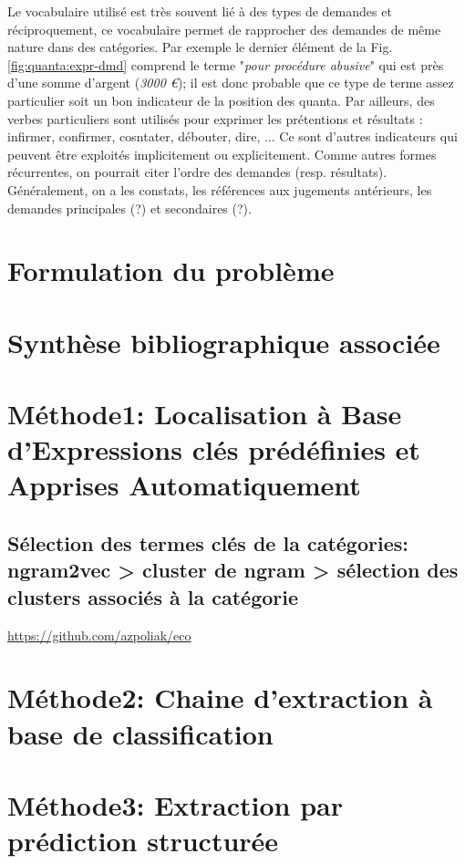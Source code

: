 Le vocabulaire utilisé est très souvent lié à des types de demandes et réciproquement, ce vocabulaire permet de rapprocher des demandes de même nature dans des catégories. Par exemple le dernier élément de la Fig. \ref{fig:quanta:expr-dmd} comprend le terme "\textit{pour procédure abusive}" qui est près d'une somme d'argent (\textit{3000 \euro{}}); il est donc probable que ce type de terme assez particulier soit un bon indicateur de la position des quanta. Par ailleurs, des verbes particuliers sont utilisés pour exprimer les prétentions et résultats : infirmer, confirmer, cosntater, débouter, dire, ... Ce sont d'autres indicateurs qui peuvent être exploités implicitement ou explicitement. Comme autres formes récurrentes, on pourrait citer l'ordre des demandes (resp. résultats). Généralement, on a les constats, les références aux jugements antérieurs, les demandes principales (?) et secondaires (?).

\section{Formulation du problème}
\label{sec:quanta:probleme}

\section{Synthèse bibliographique associée}
\label{sec:quanta:biblio}

\section{Méthode1: Localisation à Base d'Expressions clés prédéfinies et Apprises Automatiquement}
\label{sec:quanta:baseline}

\subsection{Sélection des termes clés de la catégories: ngram2vec > cluster de ngram > sélection des clusters associés à la catégorie }

\url{https://github.com/azpoliak/eco}

\section{Méthode2: Chaine d'extraction à base de classification}

\section{Méthode3: Extraction par prédiction structurée}

